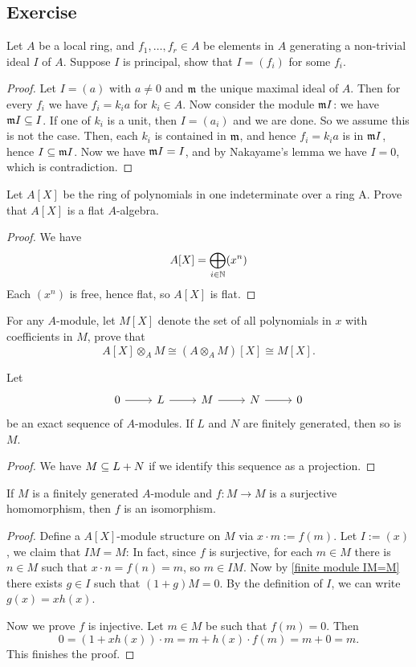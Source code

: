 \subsection{Exercise}
\begin{exercise}
Let $A$ be a local ring, and $f_1,\dots,f_r\in A$ be elements in $A$ generating a non-trivial ideal $I$ of $A$. Suppose $I$ is principal, show that $I=(f_i)$ for some $f_i$.
\end{exercise}
\begin{proof}
Let $I=(a)$ with $a\neq 0$ and $\mathfrak{m}$ the unique maximal ideal of $A$. Then for every $f_i$ we have $f_i=k_ia$ for $k_i\in A$. Now consider the module $\mathfrak{m} I$: we have $\mathfrak{m} I\subseteq I$. If one of $k_i$ is a unit, then $I=(a_i)$ and we are done. So we assume this is not the case. Then, each $k_i$ is contained in $\mathfrak{m}$, and hence $f_i=k_ia$ is in $\mathfrak{m} I$, hence $I\subseteq\mathfrak{m} I$. Now we have $\mathfrak{m} I=I$, and by Nakayame's lemma we have $I=0$, which is contradiction.
\end{proof}
\begin{exercise}
Let $A[X]$ be the ring of polynomials in one indeterminate over a ring A. Prove that $A[X]$ is a flat $A$-algebra.
\end{exercise}
\begin{proof}
We have
\[A[X]=\bigoplus_{i\in\mathbb{N}}(x^n)\]
Each $(x^n)$ is free, hence flat, so $A[X]$ is flat.
\end{proof}
\begin{exercise}
For any $A$-module, let $M[X]$ denote the set of all polynomials in $x$ with coefficients in $M$, prove that
\[A[X]\otimes_AM\cong (A\otimes_AM)[X]\cong M[X].\]
\end{exercise}
\begin{exercise}
Let 
\[\begin{tikzcd}
0\ar[r]&L\ar[r]&M\ar[r]&N\ar[r]&0
\end{tikzcd}\]
be an exact sequence of $A$-modules. If $L$ and $N$ are finitely generated, then so is $M$.
\end{exercise}
\begin{proof}
We have $M\subseteq L+N$ if we identify this sequence as a projection.
\end{proof}
\begin{exercise}
If $M$ is a finitely generated $A$-module and $f:M\to M$ is a surjective homomorphism, then $f$ is an isomorphism.
\end{exercise}
\begin{proof}
Define a $A[X]$-module structure on $M$ via $x\cdot m:=f(m)$. Let $I:=(x)$, we claim that $IM=M$: In fact, since $f$ is surjective, for each $m\in M$ there is $n\in M$ such that $x\cdot n=f(n)=m$, so $m\in IM$. Now by \cref{finite module IM=M} there exists $g\in I$ such that $(1+g)M=0$. By the definition of $I$, we can write $g(x)=xh(x)$.\par
Now we prove $f$ is injective. Let $m\in M$ be such that $f(m)=0$. Then
\[0=(1+xh(x))\cdot m=m+h(x)\cdot f(m)=m+0=m.\]
This finishes the proof.
\end{proof}
